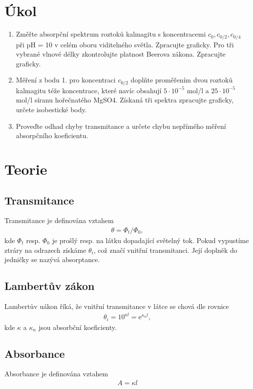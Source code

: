\documentclass[a4paper,12pt]{article}
\begin{document}
\newcommand{\st}{^{\circ}}

\section{Úkol}

\begin{enumerate}
\item Změřte absorpční spektrum roztoků kalmagitu s koncentracemi $c_0, c_{0/2}, c_{0/4}$ při pH = 10 v celém oboru viditelného světla. Zpracujte graficky. Pro tři vybrané vlnové délky zkontrolujte platnost Beerova zákona. Zpracujte graficky.
\item Měření z bodu 1. pro koncentraci $c_{0/2}$ doplňte proměřením dvou roztoků kalmagitu téže koncentrace, které navíc obsahují $5\cdot 10^{-5}$ mol/l a $25\cdot 10^{-5}$ mol/l síranu hořečnatého MgSO4. Získaná tři spektra zpracujte graficky, určete isobestické body.
\item Proveďte odhad chyby transmitance a určete chybu nepřímého měření absorpčního koeficientu.
\end{enumerate}

\section{Teorie}
\subsection{Transmitance}
Transmitance je definována vztahem
\begin{eqnarray}
\theta = \Phi_t/\Phi_0,
\end{eqnarray}
kde $\Phi_t$ resp. $\Phi_0$ je prošlý resp. na látku dopadající světelný tok. Pokud vypustíme ztráry na odrazech získáme $\theta_i$, což značí vnitřní transmitanci. 
Její doplněk do jedničky se nazývá absorptance.

\subsection{Lambertův zákon}
Lambertův uákon říká, že vnitřní transmitance v látce se chová dle rovnice
\begin{eqnarray}
\theta_i=10^{\kappa l}=\mbox{e}^{\kappa_nl},
\end{eqnarray}
kde $\kappa$ a $\kappa_n$ jsou absorbční koeficienty.

\subsection{Absorbance}
Absorbance je definována vztahem
\begin{eqnarray}
A=\kappa l
\end{eqnarray}
\end{document}
